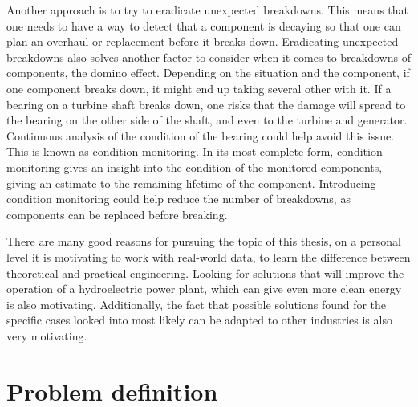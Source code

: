Another approach is to try to eradicate unexpected breakdowns. This means that one needs to have a way to detect that a component is decaying so that one can plan an overhaul or replacement before it breaks down. Eradicating unexpected breakdowns also solves another factor to consider when it comes to breakdowns of components, the domino effect. Depending on the situation and the component, if one component breaks down, it might end up taking several other with it. If a bearing on a turbine shaft breaks down, one risks that the damage will spread to the bearing on the other side of the shaft, and even to the turbine and generator. Continuous analysis of the condition of the bearing could help avoid this issue. This is known as condition monitoring. In its most complete form, condition monitoring gives an insight into the condition of the monitored components, giving an estimate to the remaining lifetime of the component. Introducing condition monitoring could help reduce the number of breakdowns, as components can be replaced before breaking.

There are many good reasons for pursuing the topic of this thesis, on a personal level it is motivating to work with real-world data, to learn the difference between theoretical and practical engineering. Looking for solutions that will improve the operation of a hydroelectric power plant, which can give even more clean energy is also motivating. Additionally, the fact that possible solutions found for the specific cases looked into most likely can be adapted to other industries is also very motivating. 




    


\section{Problem definition}

